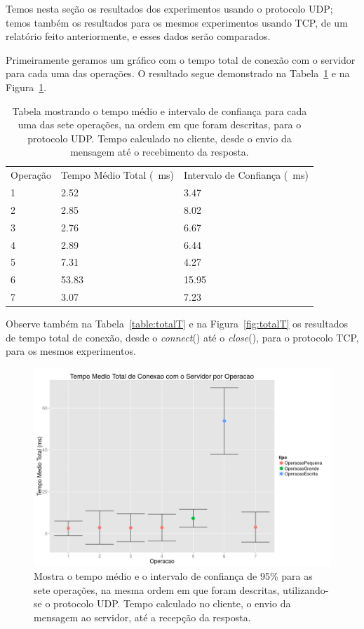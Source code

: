 \documentclass[12pt,a4paper]{article}
\begin{document}
Temos nesta seção os resultados dos experimentos usando o protocolo UDP; temos também os resultados para os mesmos experimentos usando TCP, de um relatório feito anteriormente, e esses dados serão comparados.
    
Primeiramente geramos um gráfico com o tempo total de conexão com o servidor para cada uma das operações. O resultado segue demonstrado na Tabela~\ref{table:totalU} e na Figura~\ref{fig:totalU}.

\begin{table}[h]
\centering
\caption{Tabela mostrando o tempo médio e intervalo de confiança para cada uma das sete operações, na ordem em que foram descritas, para o protocolo UDP. Tempo calculado no cliente, desde o envio da mensagem até o recebimento da resposta.}
\label{table:totalU}
\begin{tabular}{lll}
Operação & Tempo Médio Total (\SI{}{\milli\second})  & Intervalo de Confiança (\SI{}{\milli\second})           \\
1        & 2.52 & 3.47  \\
2        & 2.85 & 8.02 \\
3        & 2.76 & 6.67 \\
4        & 2.89 & 6.44 \\
5        & 7.31 & 4.27 \\
6        & 53.83 & 15.95 \\
7        & 3.07 & 7.23
\end{tabular}
\end{table}

Observe também na Tabela~\ref{table:totalT} e na Figura~\ref{fig:totalT} os resultados de tempo total de conexão, desde o {\it connect}() até o {\it close}(), para o protocolo TCP, para os mesmos experimentos.

\begin{figure}[h]
\centering
\includegraphics[width=\textwidth]{diagrama/resultadosTempoTotalUDP.png}
\caption{Mostra o tempo médio e o intervalo de confiança de 95\% para as sete operações, na mesma ordem em que foram descritas, utilizando-se o protocolo UDP. Tempo calculado no cliente, o envio da mensagem ao servidor, até a recepção da resposta.}
\label{fig:totalU}
\end{figure}
\end{document}
